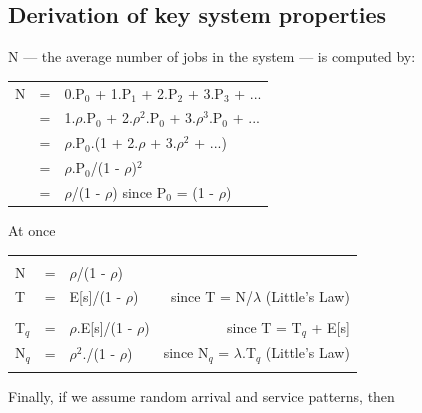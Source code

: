 \documentclass[12pt,fleqn]{report}
\begin{document}
\subsection{Derivation of key system properties}

N --- the average number of jobs in the system --- 
is computed by:

\begin{tabular}{c c l}
N & = & 0.P$_0$ + 1.P$_1$ + 2.P$_2$ + 3.P$_3$ + ... \\
  & = & 1.$\rho$.P$_0$ + 2.$\rho^2$.P$_0$ + 3.$\rho^3$.P$_0$ + ...\\
  & = & $\rho$.P$_0$.(1 + 2.$\rho$ + 3.$\rho^2$ + ...)\\
  & = & $\rho$.P$_0$/(1 - $\rho$)$^2$\\
  & = & $\rho$/(1 - $\rho$)  \hspace*{2in} since P$_0$ = (1 - $\rho$)\\
\end{tabular}

\noindent
At once

\begin{center}
\begin{tabular}{|| l c l  r ||}
\hline
         &&&\\
N        & = & $\rho$/(1 - $\rho$) &  \\
T        & = & E[s]/(1 - $\rho$)   &  \hspace*{1in}since T = N/$\lambda$ (Little's Law) \\
         &&&\\
T$_q$    & = & $\rho$.E[s]/(1 - $\rho$)  & since T = T$_q$ + E[s] \\
N$_q$    & = & $\rho^2$./(1 - $\rho$)  & since N$_q$ = $\lambda$.T$_q$
(Little's Law)\\
         &&&\\
\hline
\end{tabular}
\end{center}

\noindent
Finally, if we assume random arrival and service patterns,
then 
  
\end{document}
